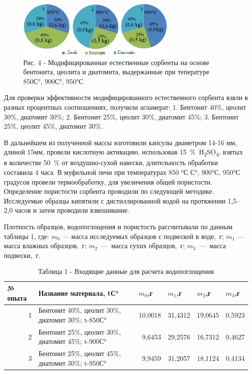 \begin{figure}[H]
	\centering
	\includegraphics[width=0.7\textwidth]{media/chem/image4}
	\caption*{Рис. 4 - Модифицированные естественные сорбенты на
основе бентонита, цеолита и диатомита, выдержанные при тепературе 850С°,
900С°, 950°С}
\end{figure}

\begin{multicols}{2}
Для проверки эффективности модифицированного естественного сорбента
взяли в разных процентных соотношениях, получили агламерат: 1. Бентонит
40\%, цеолит 30\%, диатомит 30\%; 2. Бентонит 25\%, цеолит 30\%,
диатомит 45\%; 3. Бентонит 25\%, цеолит 45\%, диатомит 30\%.

В дальнейшем из полученной массы изготовили капсулы диаметром 14-16 мм,
длиной 15мм, провели кислотную активацию, использовав
15~\%~H\textsubscript{2}SO\textsubscript{4}, взятых в количестве 50~\%
от воздушно-сухой навески, длительность обработки составила 4 часа. В
муфельной печи при температурах 850 °С С°, 900°С, 950°С градусов провели
термообработку, для увеличения общей пористости. Определение пористости
сорбента проводили по следующей методике. Исследуемые образцы кипятили с
дистиллированной водой на протяжении 1,5--2,0 часов и затем проводили
взвешивание.

Плотность образцов, водопоглощения и пористость рассчитывали по данным
таблицы 1, где: $m_0$ --- масса исследуемых образцов с
подвеской в воде,~г; $m_1$ --- масса влажных образцов,~г;
$m_2$~---~масса сухих образцов,~г;
$m_3$~---~масса подвески,~г.
\end{multicols}

\begin{table}[H]
\caption*{Таблица 1 - Входящие данные для расчета водопоглощения}
\centering
\begin{tabular}{|r|p{}|r|r|r|r|}
\hline
\multicolumn{1}{|l|}{№ опыта} & Название материала, tС° & \multicolumn{1}{l|}{$m_0$,г} & \multicolumn{1}{l|}{$m_1$,г} & \multicolumn{1}{l|}{$m_2$,г} & \multicolumn{1}{l|}{$m_3$,г} \\ \hline
1 & Бентонит 40\%, цеолит 30\%, диатомит 30\%; t-850С° & 10,0018 & 31,4312 & 19,0645 & 0,5923 \\ \hline
2 & Бентонит 25\%, цеолит 30\%, диатомит 45\%; t-900С° & 9,6453  & 29,2576 & 16,7312 & 0,4627 \\ \hline
3 & Бентонит 25\%, цеолит 45\%, диатомит 30\%; t-950С° & 9,9459  & 31,2057 & 18,1124 & 0,4134 \\ \hline
\end{tabular}
\end{table}

